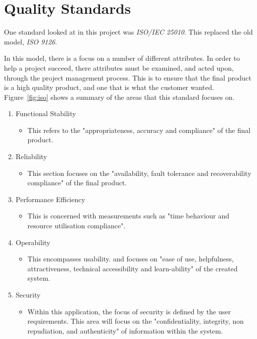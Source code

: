 \section{Quality Standards}

One standard looked at in this project was \textit{ISO/IEC 25010}. This replaced the old model, \textit{ISO 9126}.

In this model, there is a focus on a number of different attributes. In order to help a project succeed, there attributes must be examined, and acted upon, through the project management process. This is to ensure that the final product is a high quality product, and one that is what the customer wanted. Figure~\ref{fig:iso} shows a summary of the areas that this standard focuses on. 

\begin{enumerate}
\item Functional Stability
\begin{itemize}
\item This refers to the "appropriateness, accuracy and compliance" of the final product. \parencite{iso}
\end{itemize}

\item Reliability
\begin{itemize}
\item This section focuses on the "availability, fault tolerance and recoverability compliance" of the final product. \parencite{iso}
\end{itemize}

\item Performance Efficiency
\begin{itemize}
\item This is concerned with measurements such as "time behaviour and resource utilisation compliance". \parencite{iso}
\end{itemize}

\item Operability
\begin{itemize}
\item This encompasses usability. and focuses on "ease of use, helpfulness, attractiveness, technical accessibility and learn-ability" of the created system. \parencite{iso}
\end{itemize}

\item Security
\begin{itemize}
\item Within this application, the focus of security is defined by the user requirements. This area will focus on the "confidentiality, integrity, non repudiation, and authenticity" of information within the system.
\end{itemize}


\end{enumerate}
